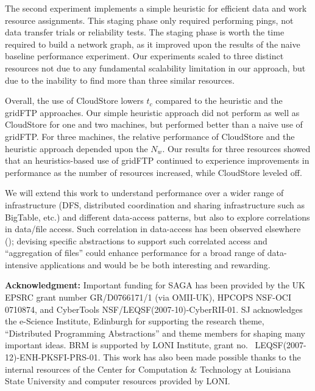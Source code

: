 \documentclass{rspublic}
\begin{document}
The second experiment implements a simple heuristic for efficient data
and work resource assignments.  This staging phase only required
performing pings, not data transfer trials or reliability tests.  The
staging phase is worth the time required to build a network graph, as
it improved upon the results of the naive baseline performance
experiment. Our experiments scaled to three distinct resources not due
to any fundamental scalability limitation in our approach, but due to
the inability to find more than three similar resources.
 
Overall, the use of CloudStore lowers $t_c$ compared to the
heuristic and the gridFTP approaches. Our simple heuristic 
approach did not perform as well as CloudStore for one and two
machines, but performed better than a naive use of gridFTP.  For three
machines, the relative performance of CloudStore and the heuristic
approach depended upon the $N_w$.  Our results for three resources
showed that an heuristics-based use of gridFTP continued to experience
improvements in performance as the number of resources increased, while
CloudStore leveled off.  

We will extend this work to understand performance over a wider range
of infrastructure (DFS, distributed coordination and sharing
infrastructure such as BigTable, etc.) and different data-access
patterns, but also to explore correlations in data/file access.  Such
correlation in data-access has been observed elsewhere
(\cite{filecule}); devising specific abstractions to support such
correlated access and ``aggregation of files'' could enhance
performance for a broad range of data-intensive applications and would
be be both interesting and rewarding.

{\bf Acknowledgment:} Important funding for SAGA has been provided by
the UK EPSRC grant number GR/D0766171/1 (via OMII-UK), HPCOPS
NSF-OCI 0710874, and CyberTools NSF/LEQSF(2007-10)-CyberRII-01.
 SJ acknowledges the e-Science Institute, Edinburgh
for supporting the research theme, ``Distributed Programming
Abstractions'' and theme members for shaping many important ideas. BRM
is supported by LONI Institute, grant no. \
LEQSF(2007-12)-ENH-PKSFI-PRS-01. This work has also been made possible
thanks to the internal resources of the Center for Computation \&
Technology at Louisiana State University and computer resources
provided by LONI.

\vspace{-0.4cm}


%
 

\end{document}
